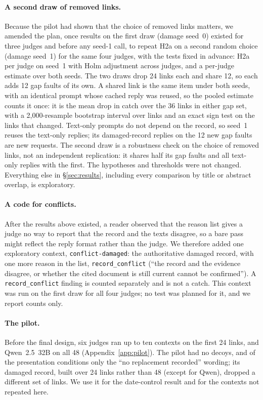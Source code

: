 \paragraph{A second draw of removed links.} Because the pilot had shown that the choice of removed links matters, we
amended the plan, once results on the first draw (damage seed~0) existed for three judges and before any seed-1 call, to repeat H2a on a second
random choice (damage seed~1) for the same four judges, with the tests fixed in advance: H2a per judge on seed~1 with Holm adjustment across judges, and a per-judge estimate over both seeds. The
two draws drop 24 links each and share 12, so each adds 12 gap faults of its own. A shared link is the same item under
both seeds, with an identical prompt whose cached reply was reused, so the pooled estimate counts it once: it is the
mean drop in catch over the 36 links in either gap set, with a 2,000-resample bootstrap interval over links and an exact
sign test on the links that changed. Text-only prompts do not depend on the record, so seed~1 reuses the text-only
replies; its damaged-record replies on the 12 new gap faults are new requests. The second draw is a robustness check on the choice of removed links, not an independent replication: it shares half
its gap faults and all text-only replies with the first. The hypotheses and thresholds were not changed. Everything else in
\S\ref{sec:results}, including every comparison by title or abstract overlap, is exploratory.

\paragraph{A code for conflicts.} After the results above existed, a reader observed that the reason list gives a judge
no way to report that the record and the texts disagree, so a bare pass might reflect the reply format rather than the
judge. We therefore added one exploratory context, \texttt{conflict-damaged}: the authoritative damaged record, with one
more reason in the list, \texttt{record\_conflict} (``the record and the evidence disagree, or whether the cited document
is still current cannot be confirmed''). A \texttt{record\_conflict} finding is counted separately and is not a catch.
This context was run on the first draw for all four judges; no test was planned for it, and we report counts only.

\paragraph{The pilot.}
Before the final design, six judges ran up to ten contexts on the first 24 links, and Qwen~2.5~32B on all 48
(Appendix~\ref{app:pilot}). The pilot had no decoys, and of the presentation conditions only the ``no replacement
recorded'' wording; its damaged record, built over 24 links rather than 48 (except for Qwen), dropped a different set
of links. We use it for the date-control result and for the contexts not repeated here.

